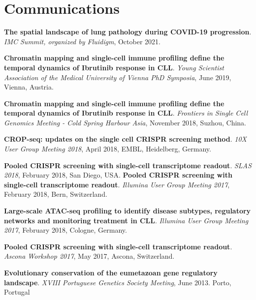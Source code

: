 \documentclass[11pt,a4paper,roman]{moderncv} %
\begin{document}
\section{Communications}
        \begin{etaremune}[leftmargin=1.0cm,itemindent=0pt,topsep=10pt,itemsep=2pt,partopsep=0pt,parsep=0pt]
        \item
        \textbf{The spatial landscape of lung pathology during COVID-19 progression}. \textit{IMC Summit, organized by Fluidigm}, October 2021.
        \item
        \textbf{Chromatin mapping and single-cell immune profiling define the temporal dynamics of Ibrutinib response in CLL}. \textit{Young Scientist Association of the Medical University of Vienna PhD Symposia}, June 2019, Vienna, Austria.
        \item
        \textbf{Chromatin mapping and single-cell immune profiling define the temporal dynamics of Ibrutinib response in CLL}. \textit{Frontiers in Single Cell Genomics Meeting - Cold Spring Harbour Asia}, November 2018, Suzhou, China.
        \item
        \textbf{CROP-seq: updates on the single cell CRISPR screening method}. \textit{10X User Group Meeting 2018}, April 2018, EMBL, Heidelberg, Germany.
        \item
        \textbf{Pooled CRISPR screening with single-cell transcriptome readout}. \textit{SLAS 2018}, February 2018, San Diego, USA.
        \textbf{Pooled CRISPR screening with single-cell transcriptome readout}. \textit{Illumina User Group Meeting 2017}, February 2018, Bern, Switzerland.
        \item
        \textbf{Large-scale ATAC-seq profiling to identify disease subtypes, regulatory networks and monitoring treatment in CLL}. \textit{Illumina User Group Meeting 2017}, February 2018, Cologne, Germany.
        \item
        \textbf{Pooled CRISPR screening with single-cell transcriptome readout}. \textit{Ascona Workshop 2017}, May 2017, Ascona, Switzerland.
        \item
        \textbf{Evolutionary conservation of the eumetazoan gene regulatory landscape}. \textit{XVIII Portuguese Genetics Society Meeting}, June 2013. Porto, Portugal
        \end{etaremune}
\end{document}
